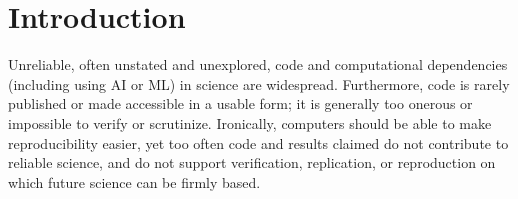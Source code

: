 \documentclass{comjnl}
\begin{document}
\maketitle

%


\section{Introduction}
Unreliable, often unstated and unexplored, code and computational dependencies (including using AI or ML) in science are widespread. Furthermore, code is rarely published or made accessible in a usable form; it is generally too onerous or impossible to verify or scrutinize. Ironically, computers should be able to make reproducibility easier, yet too often code and results claimed do not contribute to reliable science, and do not support verification, replication, or reproduction on which future science can be firmly based. 
\end{document}
